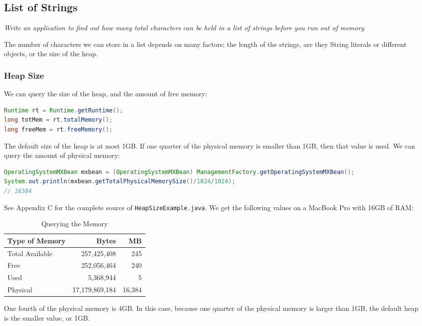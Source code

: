 \subsection{List of Strings}
\textit{Write an application to find out how many total characters can be held in a list of strings before you run out of memory}

The number of characters we can store in a list depends on many factors; the length of the strings, are they String literals or different objects, or the size of the heap. 

\subsubsection{Heap Size}

We can query the size of the heap, and the amount of free memory:
\begin{lstlisting}[language=Java]
Runtime rt = Runtime.getRuntime();
long totMem = rt.totalMemory();
long freeMem = rt.freeMemory();
\end{lstlisting}

The default size of the heap is at most 1GB. If one quarter of the physical memory is smaller than 1GB, then that value is used\cite{gcergo}. We can query the amount of physical memory:
\begin{lstlisting}[language=Java]
OperatingSystemMXBean mxbean = (OperatingSystemMXBean) ManagementFactory.getOperatingSystemMXBean();
System.out.println(mxbean.getTotalPhysicalMemorySize()/1024/1024);
// 16384
\end{lstlisting}
See Appendix C for the complete source of \texttt{HeapSizeExample.java}.
We get the following values on a MacBook Pro with 16GB of RAM:

\begin{table}[!htb]
\centering
\begin{tabulary}{\columnwidth}{ | l | r | r |}
\hline
\textbf{Type of Memory} &  \textbf{Bytes}& \textbf{MB} \\ \hline 
Total Available & 257,425,408 & 245 \\ \hline
Free & 252,056,464 & 240 \\ \hline
Used & 5,368,944 & 5 \\ \hline
Physical & 17,179,869,184 & 16,384 \\ \hline
\end{tabulary}
\caption{Querying the Memory}\label{tab:memory}
\end{table}

One fourth of the physical memory is 4GB. In this case, because one quarter of the physical memory is larger than 1GB, the default heap is the smaller value, or 1GB.

